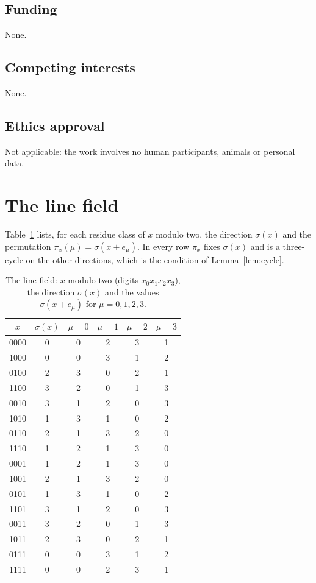 \documentclass[11pt]{amsart}
\theoremstyle{definition}
\theoremstyle{remark}
\numberwithin{equation}{section}
\begin{document}
\subsection*{Funding}
None.

\subsection*{Competing interests}
None.

\subsection*{Ethics approval}
Not applicable: the work involves no human participants, animals or
personal data.


\appendix

\section{The line field}\label{app:table}

Table~\ref{tab:sigma} lists, for each residue class of $x$ modulo two, the
direction $\sigma(x)$ and the permutation $\pi_x(\mu)=\sigma(x+e_\mu)$. In every
row $\pi_x$ fixes $\sigma(x)$ and is a three-cycle on the other directions,
which is the condition of Lemma~\ref{lem:cycle}.

\begin{table}[h]
\caption{The line field: $x$ modulo two (digits $x_0x_1x_2x_3$), the
direction $\sigma(x)$ and the values $\sigma(x+e_\mu)$ for $\mu=0,1,2,3$.}
\label{tab:sigma}
\begin{tabular}{cccccc}
\toprule
$x$&$\sigma(x)$&$\mu=0$&$\mu=1$&$\mu=2$&$\mu=3$\\
\midrule
0000 & 0 & 0 & 2 & 3 & 1 \\
1000 & 0 & 0 & 3 & 1 & 2 \\
0100 & 2 & 3 & 0 & 2 & 1 \\
1100 & 3 & 2 & 0 & 1 & 3 \\
0010 & 3 & 1 & 2 & 0 & 3 \\
1010 & 1 & 3 & 1 & 0 & 2 \\
0110 & 2 & 1 & 3 & 2 & 0 \\
1110 & 1 & 2 & 1 & 3 & 0 \\
0001 & 1 & 2 & 1 & 3 & 0 \\
1001 & 2 & 1 & 3 & 2 & 0 \\
0101 & 1 & 3 & 1 & 0 & 2 \\
1101 & 3 & 1 & 2 & 0 & 3 \\
0011 & 3 & 2 & 0 & 1 & 3 \\
1011 & 2 & 3 & 0 & 2 & 1 \\
0111 & 0 & 0 & 3 & 1 & 2 \\
1111 & 0 & 0 & 2 & 3 & 1 \\
\bottomrule
\end{tabular}
\end{table}
\end{document}
